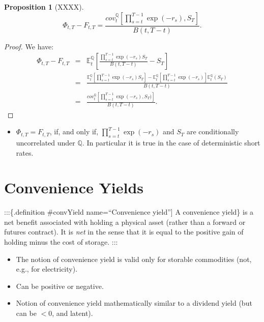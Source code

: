 \documentclass[
  12pt,
]{book}
\providecommand{\tightlist}{%
  \setlength{\itemsep}{0pt}\setlength{\parskip}{0pt}}
\newtheorem{proposition}{Proposition}[chapter]
\theoremstyle{definition}
\theoremstyle{definition}
\theoremstyle{definition}
\theoremstyle{definition}
\theoremstyle{remark}
\begin{document}
\begin{proposition}[XXXX]
\protect\hypertarget{prp:XXX}{}\label{prp:XXX}\[
\Phi_{t,T} - F_{t,T} = \frac{cov^{\mathbb{Q}}_t \left[\prod^{T-1}_{s=t} \exp (-r_s), S_T\right]}{B(t,T-t)}.
\]
\end{proposition}

\begin{proof}
We have:
\begin{eqnarray*}
\Phi_{t,T} - F_{t,T} & = & \mathbb{E}^{\mathbb{Q}}_t \left[\frac{\prod^{T-1}_{s=t} \exp (-r_s) S_T }{B(t,T-t)}- S_T\right] \\
&=& \frac{\mathbb{E}^{\mathbb{Q}}_t \left[\prod^{T-1}_{s=t} \exp (-r_s) S_T\right] - \mathbb{E}^{\mathbb{Q}}_t \left[\prod^{T-1}_{s=t} \exp (-r_s)\right] \mathbb{E}^{\mathbb{Q}}_t (S_T)}{B(t,T-t)} \\
&=&\frac{cov^{\mathbb{Q}}_t \left[\prod^{T-1}_{s=t} \exp (-r_s), S_T)\right]}{B(t,T-t)}. \end{eqnarray*}
\end{proof}

\begin{itemize}
\tightlist
\item
  \(\Phi_{t,T} = F_{t,T}\), if, and only if, \(\prod^{T-1}_{s=t} \exp (-r_s)\) and \(S_T\) are conditionally uncorrelated under \(\mathbb{Q}\). In particular it is true in the case of deterministic short rates.
\end{itemize}

\hypertarget{FCFPConvenience}{%
\section{Convenience Yields}\label{FCFPConvenience}}

:::\{.definition \#convYield name=``Convenience yield''{]}
A convenience yield\} is a net benefit associated with holding a physical asset (rather than a forward or futures contract). It is \emph{net} in the sense that it is equal to the positive gain of holding minus the cost of storage.
:::

\begin{itemize}
\tightlist
\item
  The notion of convenience yield is valid only for storable commodities (not, e.g., for electricity).
\item
  Can be positive or negative.
\item
  Notion of convenience yield mathematically similar to a dividend yield (but can be \(<0\), and latent).
\end{itemize}
\end{document}

